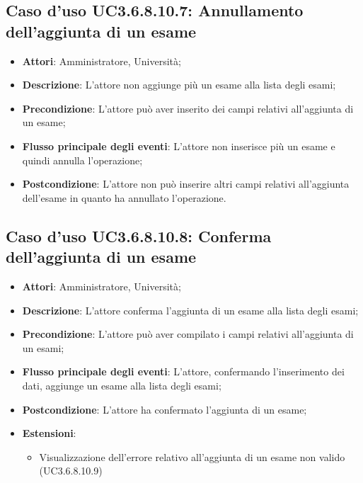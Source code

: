 \subsection{Caso d'uso \texorpdfstring{UC3.6.8.10.7}{UC3.6.8.10.7}: Annullamento dell’aggiunta di un esame}
\begin{itemize}
\item \textbf{Attori}: Amministratore, Università;
\item \textbf{Descrizione}: L'attore non aggiunge più un esame alla lista degli esami;

\item \textbf{Precondizione}: L'attore può aver inserito dei campi relativi all'aggiunta di un esame;

\item \textbf{Flusso principale degli eventi}: L'attore non inserisce più un esame e quindi annulla l'operazione;

\item \textbf{Postcondizione}: L'attore non può inserire altri campi relativi all'aggiunta dell'esame in quanto ha annullato l'operazione.

\end{itemize}
\subsection{Caso d'uso \texorpdfstring{UC3.6.8.10.8}{UC3.6.8.10.8}: Conferma dell’aggiunta di un esame}
\begin{itemize}
\item \textbf{Attori}: Amministratore, Università;
\item \textbf{Descrizione}: L'attore conferma l'aggiunta di un esame alla lista degli esami;

\item \textbf{Precondizione}: L'attore può aver compilato i campi relativi all'aggiunta di un esami;

\item \textbf{Flusso principale degli eventi}: L'attore, confermando l'inserimento dei dati, aggiunge un esame alla lista degli esami;

\item \textbf{Postcondizione}: L'attore ha confermato l'aggiunta di un esame;

\item \textbf{Estensioni}:
\begin{itemize}
\item Visualizzazione dell'errore relativo all’aggiunta di un esame non valido (UC3.6.8.10.9)
\end{itemize}
\end{itemize}
